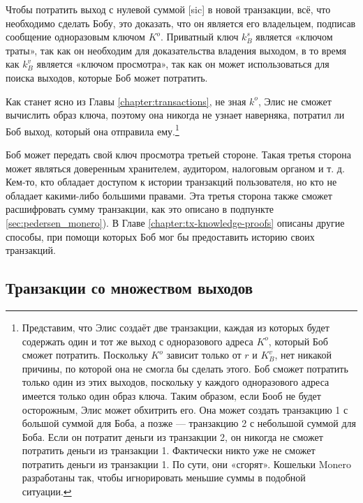 Чтобы потратить выход с нулевой суммой [sic] в новой транзакции, всё, что необходимо сделать Бобу, это доказать, что он является его владельцем, подписав сообщение одноразовым ключом $K^o$. Приватный ключ $k_B^s$ является «ключом траты», так как он необходим для доказательства владения выходом, в то время как $k_B^v$ является «ключом просмотра», так как он может использоваться для поиска выходов, которые Боб может потратить.

Как станет ясно из Главы \ref{chapter:transactions}, не зная $k^o$, Элис не сможет вычислить образ ключа, поэтому она никогда не узнает наверняка, потратил ли Боб выход, который она отправила ему.\footnote{Представим, что Элис создаёт две транзакции, каждая из которых будет содержать один и тот же выход с одноразового адреса $K^o$, который Боб сможет потратить. Поскольку $K^o$ зависит только от $r$ и $K_B^v$, нет никакой причины, по которой она не смогла бы сделать этого. Боб сможет потратить только один из этих выходов, поскольку у каждого одноразового адреса имеется только один образ ключа. Таким образом, если Бооб не будет осторожным, Элис может обхитрить его. Она может создать транзакцию 1 с большой суммой для Боба, а позже — транзакцию 2 с небольшой суммой для Боба. Если он потратит деньги из транзакции 2, он никогда не сможет потратить деньги из транзакции 1. Фактически никто уже не сможет потратить деньги из транзакции 1. По сути, они «сгорят». Кошельки Monero разработаны так, чтобы игнорировать меньшие суммы в подобной ситуации.}

Боб может передать свой ключ просмотра третьей стороне. Такая третья сторона может являться доверенным хранителем, аудитором, налоговым органом и т. д. Кем-то, кто облада\-ет доступом к истории транзакций пользователя, но кто не обладает какими-либо большими правами. Эта третья сторона также  сможет расшифровать сумму транзакции, как это описа\-но в подпункте \ref{sec:pedersen_monero}). В Главе \ref{chapter:tx-knowledge-proofs} описаны другие способы, при помощи которых Боб мог бы предоставить историю своих транзакций.


\subsection{Транзакции со множеством выходов}
\label{sec:multi_out_transactions}

